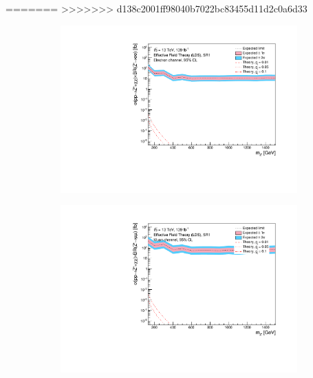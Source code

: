 \documentclass[12pt, a4paper]{book}
\begin{document}
=======
>>>>>>> d138c2001ff98040b7022bc83455d11d2c0a6d33
\begin{figure}[!ht]
	\centering
	\begin{subfigure}[b]{0.49\textwidth}
      \centering
      \includegraphics[width=1\textwidth]{Limits/Model_independent/50-100/EFT_LDS/mass_exclusion_ee.pdf}
   \end{subfigure}
   \hfill
   \begin{subfigure}[b]{0.49\textwidth}
      \centering
      \includegraphics[width=1\textwidth]{Limits/Model_independent/50-100/EFT_LDS/mass_exclusion_uu.pdf}
   \end{subfigure}
   \hfill
   \begin{subfigure}[b]{0.49\textwidth}
      \centering

\end{subfigure}
\end{figure}
\end{document}
